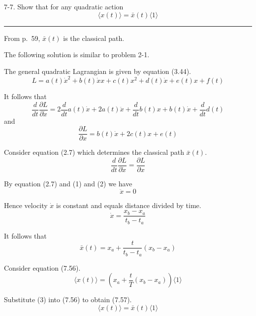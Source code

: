 \documentclass[12pt]{article}
\begin{document}
7-7.
Show that for any quadratic action
\begin{equation*}
\langle x(t)\rangle=\bar x(t)\langle1\rangle
\tag{7.57}
\end{equation*}

\bigskip
\hrule

\bigskip
From p.~59, $\bar x(t)$ is the classical path.

\bigskip
The following solution is similar to problem 2-1.

\bigskip
The general quadratic Lagrangian is given by equation (3.44).
\begin{equation*}
L=a(t)\dot x^2+b(t)\dot xx+c(t)x^2+d(t)\dot x+e(t)x+f(t)
\tag{3.44}
\end{equation*}

It follows that
\begin{equation*}
\frac{d}{dt}\frac{\partial L}{\partial\dot x}
=2\frac{d}{dt}a(t)\dot x+2a(t)\ddot x
+\frac{d}{dt}b(t)x+b(t)\dot x+\frac{d}{dt}d(t)
\tag{1}
\end{equation*}
and
\begin{equation*}
\frac{\partial L}{\partial x}
=b(t)\dot x+2c(t)x+e(t)
\tag{2}
\end{equation*}

Consider equation (2.7) which determines the classical path $\bar x(t)$.
\begin{equation*}
\frac{d}{dt}\frac{\partial L}{\partial\dot x}=\frac{\partial L}{\partial x}
\tag{2.7}
\end{equation*}

By equation (2.7) and (1) and (2) we have
\begin{equation*}
\ddot x=0
\end{equation*}

Hence velocity $\dot x$ is constant and equals distance divided by time.
\begin{equation*}
\dot x=\frac{x_b-x_a}{t_b-t_a}
\end{equation*}

It follows that
\begin{equation*}
\bar x(t)=x_a+\frac{t}{t_b-t_a}(x_b-x_a)
\tag{3}
\end{equation*}

Consider equation (7.56).
\begin{equation*}
\langle x(t)\rangle=
\left(x_a+\frac{t}{T}(x_b-x_a)\right)\langle1\rangle
\tag{7.56}
\end{equation*}

Substitute (3) into (7.56) to obtain (7.57).
\begin{equation*}
\langle x(t)\rangle=\bar x(t)\langle1\rangle
\tag{7.57}
\end{equation*}
\end{document}

